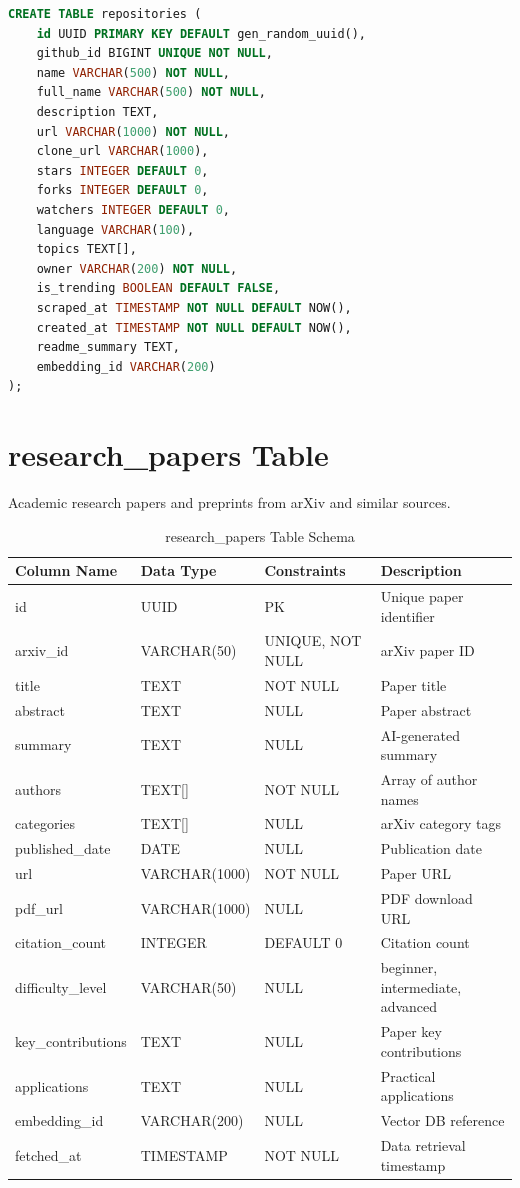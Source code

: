 \documentclass[12pt,a4paper]{report}
\begin{document}
\begin{lstlisting}[language=SQL,basicstyle=\ttfamily\small]
CREATE TABLE repositories (
    id UUID PRIMARY KEY DEFAULT gen_random_uuid(),
    github_id BIGINT UNIQUE NOT NULL,
    name VARCHAR(500) NOT NULL,
    full_name VARCHAR(500) NOT NULL,
    description TEXT,
    url VARCHAR(1000) NOT NULL,
    clone_url VARCHAR(1000),
    stars INTEGER DEFAULT 0,
    forks INTEGER DEFAULT 0,
    watchers INTEGER DEFAULT 0,
    language VARCHAR(100),
    topics TEXT[],
    owner VARCHAR(200) NOT NULL,
    is_trending BOOLEAN DEFAULT FALSE,
    scraped_at TIMESTAMP NOT NULL DEFAULT NOW(),
    created_at TIMESTAMP NOT NULL DEFAULT NOW(),
    readme_summary TEXT,
    embedding_id VARCHAR(200)
);
\end{lstlisting}

\newpage
\section{research\_papers Table}

Academic research papers and preprints from arXiv and similar sources.

\begin{table}[h]
\centering
\small
\caption{research\_papers Table Schema}
\begin{tabular}{|l|l|l|l|}
\toprule
\textbf{Column Name} & \textbf{Data Type} & \textbf{Constraints} & \textbf{Description} \\
\midrule
id & UUID & PK & Unique paper identifier \\
arxiv\_id & VARCHAR(50) & UNIQUE, NOT NULL & arXiv paper ID \\
title & TEXT & NOT NULL & Paper title \\
abstract & TEXT & NULL & Paper abstract \\
summary & TEXT & NULL & AI-generated summary \\
authors & TEXT[] & NOT NULL & Array of author names \\
categories & TEXT[] & NULL & arXiv category tags \\
published\_date & DATE & NULL & Publication date \\
url & VARCHAR(1000) & NOT NULL & Paper URL \\
pdf\_url & VARCHAR(1000) & NULL & PDF download URL \\
citation\_count & INTEGER & DEFAULT 0 & Citation count \\
difficulty\_level & VARCHAR(50) & NULL & beginner, intermediate, advanced \\
key\_contributions & TEXT & NULL & Paper key contributions \\
applications & TEXT & NULL & Practical applications \\
embedding\_id & VARCHAR(200) & NULL & Vector DB reference \\
fetched\_at & TIMESTAMP & NOT NULL & Data retrieval timestamp \\
\bottomrule
\end{tabular}
\end{table}
\end{document}
